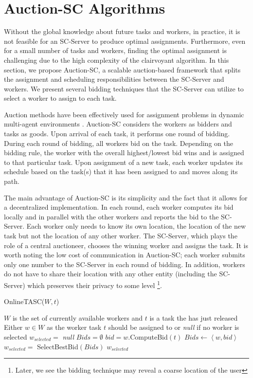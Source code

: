 \section{Auction-SC Algorithms}
\label{sec:onlinealgo}

Without the global knowledge about future tasks and workers, in practice, it is not feasible for an SC-Server to produce optimal assignments. Furthermore, even for a small number of tasks and workers, finding the optimal assignment is challenging due to the high complexity of the clairvoyant algorithm. In this section, we propose Auction-SC, a scalable auction-based framework that splits the assignment and scheduling responsibilities between the SC-Server and workers. We present several bidding techniques that the SC-Server can utilize to select a worker to assign to each task.

Auction methods have been effectively used for assignment problems in dynamic multi-agent environments \cite{Mehta05,Lagoudakis04}. Auction-SC considers the workers as bidders and tasks as goods. Upon arrival of each task, it performs one round of bidding. During each round of bidding, all workers bid on the task. Depending on the bidding rule, the worker with the overall highest/lowest bid wins and is assigned to that particular task. Upon assignment of a new task, each worker updates its schedule based on the task(s) that it has been assigned to and moves along its path.

The main advantage of Auction-SC is its simplicity and the fact that it allows for a decentralized implementation. In each round, each worker computes its bid locally and in parallel with the other workers and reports the bid to the SC-Server. Each worker only needs to know its own location, the location of the new task but not the location of any other worker. The SC-Server, which plays the role of a central auctioneer, chooses the winning worker and assigns the task. It is worth noting the low cost of communication in Auction-SC; each worker submits only one number to the SC-Server in each round of bidding. In addition, workers do not have to share their location with any other entity (including the SC-Server) which preserves their privacy to some level \footnote{Later, we see the bidding technique may reveal a coarse location of the user}.

\begin{algorithm}
\caption{OnlineTASC($W, t$)}
\label{algo:OnlineTASC}
\begin{algorithmic}[1]
\REQUIRE $W$ is the set of currently available workers and $t$ is a task the has just released
\ENSURE Either $w \in W$ as the worker task $t$ should be assigned to or \emph{null} if no worker is selected
\STATE $w_{selected} = $ \emph{null}
\STATE $Bids = \emptyset$
	\STATE $bid = w$.ComputeBid$(t)$
	\STATE $Bids \leftarrow \left\langle w, bid \right\rangle$
\ENDFOR
\STATE $w_{selected} = $ SelectBestBid$(Bids)$
\RETURN $w_{selected}$
\end{algorithmic}
\end{algorithm}

